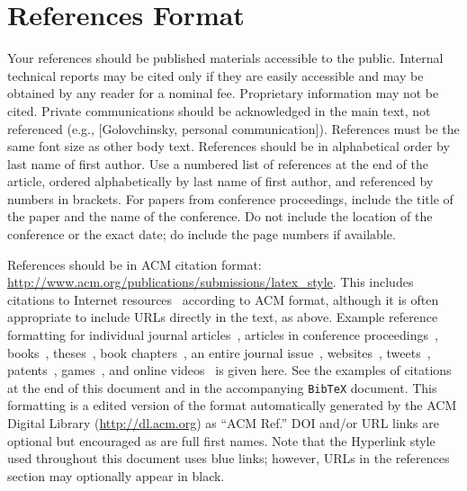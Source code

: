 \documentclass{sigchi}
\begin{document}
\section{References Format}
Your references should be published materials accessible to the
public. Internal technical reports may be cited only if they are
easily accessible and may be obtained by any reader for a nominal
fee. Proprietary information may not be cited. Private communications
should be acknowledged in the main text, not referenced (e.g.,
[Golovchinsky, personal communication]). References must be the same
font size as other body text. References should be in alphabetical
order by last name of first author. Use a numbered list of references
at the end of the article, ordered alphabetically by last name of
first author, and referenced by numbers in brackets. For papers from
conference proceedings, include the title of the paper and the name of
the conference. Do not include the location of the conference or the
exact date; do include the page numbers if available. 

References should be in ACM citation format:
\url{http://www.acm.org/publications/submissions/latex_style}.  This
includes citations to Internet
resources~\cite{CHINOSAUR:venue,cavender:writing,psy:gangnam}
according to ACM format, although it is often appropriate to include
URLs directly in the text, as above. Example reference formatting for
individual journal articles~\cite{ethics}, articles in conference
proceedings~\cite{Klemmer:2002:WSC:503376.503378},
books~\cite{Schwartz:1995:GBF}, theses~\cite{sutherland:sketchpad},
book chapters~\cite{winner:politics}, an entire journal
issue~\cite{kaye:puc},
websites~\cite{acm_categories,cavender:writing},
tweets~\cite{CHINOSAUR:venue}, patents~\cite{heilig:sensorama}, 
games~\cite{supermetroid:snes}, and
online videos~\cite{psy:gangnam} is given here.  See the examples of
citations at the end of this document and in the accompanying
\texttt{BibTeX} document. This formatting is a edited version of the
format automatically generated by the ACM Digital Library
(\url{http://dl.acm.org}) as ``ACM Ref.'' DOI and/or URL links are
optional but encouraged as are full first names. Note that the
Hyperlink style used throughout this document uses blue links;
however, URLs in the references section may optionally appear in
black.

\balance{}



\end{document}
